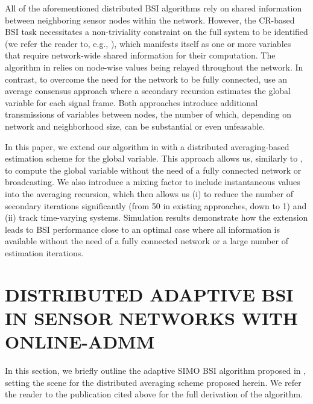 \documentclass{article}
\begin{document}
All of the aforementioned distributed BSI algorithms rely on shared information between neighboring sensor nodes within the network.
However, the CR-based BSI task necessitates a non-triviality constraint on the full system to be identified (we refer the reader to, e.g., \cite{huangAdaptiveMultichannelLeast2002,huangClassFrequencydomainAdaptive2003}), which manifests itself as one or more variables that require network-wide shared information for their computation.
The algorithm in \cite{blochbergerDBSI} relies on node-wise values being relayed throughout the network.
In contrast, to overcome the need for the network to be fully connected, \cite{yuDistributedBlindSystem2014, liuDistributedBlindIdentification2016} use an average consensus \cite{xiaoFastLinearIterations2004} approach where a secondary recursion estimates the global variable for each signal frame.
Both approaches introduce additional transmissions of variables between nodes, the number of which, depending on network and neighborhood size, can be substantial or even unfeasable.

In this paper, we extend our algorithm in \cite{blochbergerDBSI} with a distributed averaging-based \cite{xiaoFastLinearIterations2004} estimation scheme for the global variable.
This approach allows us, similarly to \cite{6334305,9914798}, to compute the global variable without the need of a fully connected network or broadcasting.
We also introduce a mixing factor to include instantaneous values into the averaging recursion, which then allows us (i) to reduce the number of secondary iterations significantly (from 50 in existing approaches, down to 1) and (ii) track time-varying systems.
Simulation results demonstrate how the extension leads to BSI performance close to an optimal case where all information is available without the need of a fully connected network or a large number of estimation iterations.

\section{DISTRIBUTED ADAPTIVE BSI IN SENSOR NETWORKS WITH ONLINE-ADMM}
\label{sec:dbsi}
In this section, we briefly outline the adaptive SIMO BSI algorithm proposed in \cite{blochbergerDBSI}, setting the scene for the distributed averaging scheme proposed herein.
We refer the reader to the publication cited above for the full derivation of the algorithm.
\end{document}
